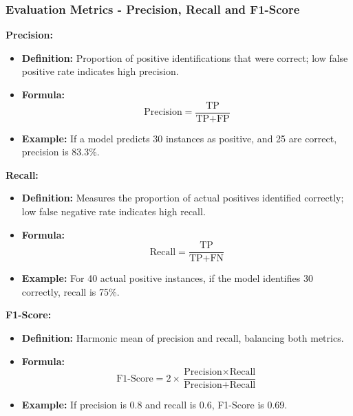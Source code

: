\documentclass[aspectratio=169]{beamer}
\begin{document}
\begin{frame}[fragile]
    \frametitle{Evaluation Metrics - Precision, Recall and F1-Score}
    \textbf{Precision:}
    \begin{itemize}
        \item \textbf{Definition:} Proportion of positive identifications that were correct; low false positive rate indicates high precision.
        \item \textbf{Formula:}
        \begin{equation}
        \text{Precision} = \frac{\text{TP}}{\text{TP} + \text{FP}}
        \end{equation}
        \item \textbf{Example:} If a model predicts 30 instances as positive, and 25 are correct, precision is 83.3\%.
    \end{itemize}

    \textbf{Recall:}
    \begin{itemize}
        \item \textbf{Definition:} Measures the proportion of actual positives identified correctly; low false negative rate indicates high recall.
        \item \textbf{Formula:}
        \begin{equation}
        \text{Recall} = \frac{\text{TP}}{\text{TP} + \text{FN}}
        \end{equation}
        \item \textbf{Example:} For 40 actual positive instances, if the model identifies 30 correctly, recall is 75\%.
    \end{itemize}

    \textbf{F1-Score:}
    \begin{itemize}
        \item \textbf{Definition:} Harmonic mean of precision and recall, balancing both metrics.
        \item \textbf{Formula:}
        \begin{equation}
        \text{F1-Score} = 2 \times \frac{\text{Precision} \times \text{Recall}}{\text{Precision} + \text{Recall}}
        \end{equation}
        \item \textbf{Example:} If precision is 0.8 and recall is 0.6, F1-Score is 0.69.
    \end{itemize}
\end{frame}
\end{document}
